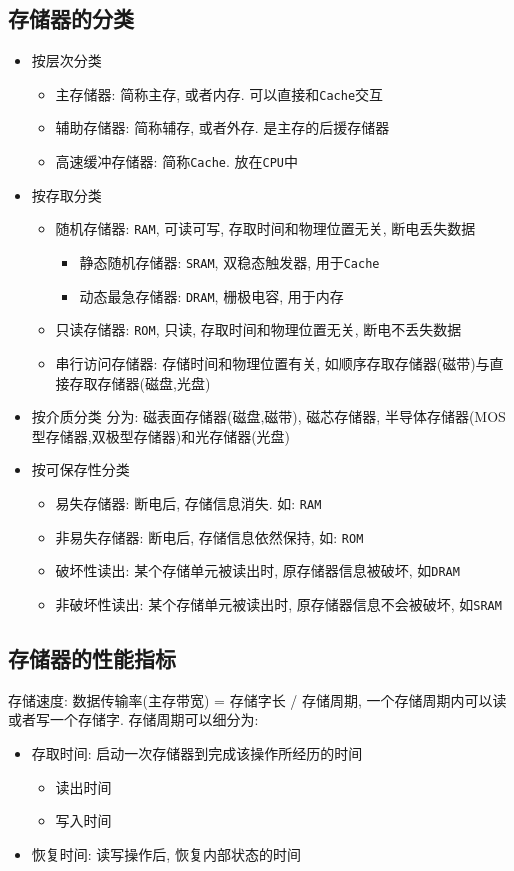 \subsection{存储器的分类}
\begin{itemize}
\item 按层次分类
\begin{itemize}
\item 主存储器: 简称主存, 或者内存. 可以直接和\verb|Cache|交互
\item 辅助存储器: 简称辅存, 或者外存. 是主存的后援存储器
\item 高速缓冲存储器: 简称\verb|Cache|. 放在\verb|CPU|中
\end{itemize}
\item 按存取分类
\begin{itemize}
\item 随机存储器: \verb|RAM|, 可读可写, 存取时间和物理位置无关, 断电丢失数据
\begin{itemize}
\item 静态随机存储器: \verb|SRAM|, 双稳态触发器, 用于\verb|Cache|
\item 动态最急存储器: \verb|DRAM|, 栅极电容, 用于内存
\end{itemize}
\item 只读存储器: \verb|ROM|, 只读, 存取时间和物理位置无关, 断电不丢失数据
\item 串行访问存储器: 存储时间和物理位置有关, 如顺序存取存储器(磁带)与直接存取存储器(磁盘,光盘)
\end{itemize}
\item 按介质分类
分为: 磁表面存储器(磁盘,磁带), 磁芯存储器, 半导体存储器(MOS型存储器,双极型存储器)和光存储器(光盘)
\item 按可保存性分类
\begin{itemize}
\item 易失存储器: 断电后, 存储信息消失. 如: \verb|RAM|
\item 非易失存储器: 断电后, 存储信息依然保持, 如: \verb|ROM|
\item 破坏性读出: 某个存储单元被读出时, 原存储器信息被破坏, 如\verb|DRAM|
\item 非破坏性读出: 某个存储单元被读出时, 原存储器信息不会被破坏, 如\verb|SRAM|
\end{itemize}
\end{itemize}
\subsection{存储器的性能指标}
存储速度: 数据传输率(主存带宽) = 存储字长 / 存储周期, 一个存储周期内可以读或者写一个存储字. 存储周期可以细分为:
\begin{itemize}
\item 存取时间: 启动一次存储器到完成该操作所经历的时间
\begin{itemize}
\item 读出时间
\item 写入时间
\end{itemize}
\item 恢复时间: 读写操作后, 恢复内部状态的时间
\end{itemize}
